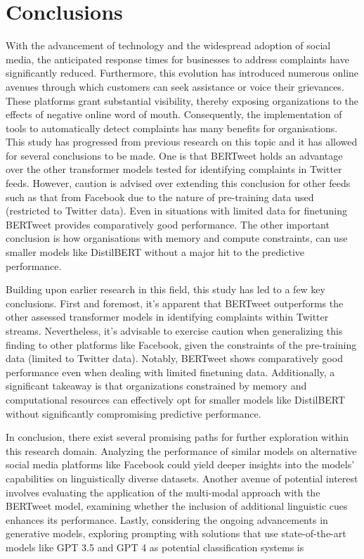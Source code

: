 \chapter{Conclusions}

With the advancement of technology and the widespread adoption of social media, the anticipated response times for businesses to address complaints have significantly reduced. Furthermore, this evolution has introduced numerous online avenues through which customers can seek assistance or voice their grievances. These platforms grant substantial visibility, thereby exposing organizations to the effects of negative online word of mouth. Consequently, the implementation of tools to automatically detect complaints has many benefits for organisations.\\

This study has progressed from previous research on this topic and it has allowed for several conclusions to be made. One is that BERTweet holds an advantage over the other transformer models tested for identifying complaints in Twitter feeds. However, caution is advised over extending this conclusion for other feeds such as that from Facebook due to the nature of pre-training data used (restricted to Twitter data). Even in situations with limited data for finetuning BERTweet provides comparatively good performance. The other important conclusion is how organisations with memory and compute constraints, can use smaller models like DistilBERT without a major hit to the predictive performance. 

Building upon earlier research in this field, this study has led to a few key conclusions. First and foremost, it's apparent that BERTweet outperforms the other assessed transformer models in identifying complaints within Twitter streams. Nevertheless, it's advisable to exercise caution when generalizing this finding to other platforms like Facebook, given the constraints of the pre-training data (limited to Twitter data). Notably, BERTweet shows comparatively good performance even when dealing with limited finetuning data. Additionally, a significant takeaway is that organizations constrained by memory and computational resources can effectively opt for smaller models like DistilBERT without significantly compromising predictive performance.

In conclusion, there exist several promising paths for further exploration within this research domain. Analyzing the performance of similar models on alternative social media platforms like Facebook could yield deeper insights into the models' capabilities on linguistically diverse datasets. Another avenue of potential interest involves evaluating the application of the multi-modal approach with the BERTweet model, examining whether the inclusion of additional linguistic cues enhances its performance. Lastly, considering the ongoing advancements in generative models, exploring prompting with solutions that use state-of-the-art models like GPT 3.5 and GPT 4 as potential classification systems is 
